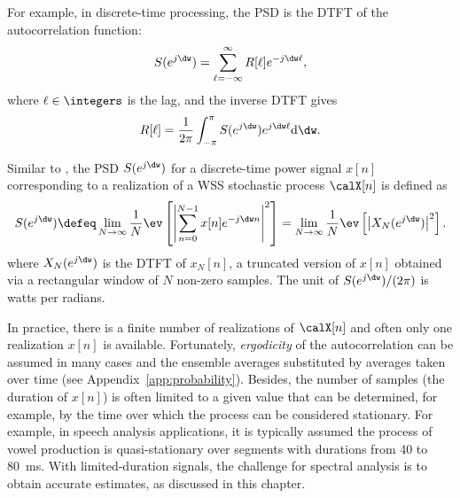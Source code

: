 For example, in discrete-time processing, the PSD is the DTFT of the autocorrelation function:
\begin{equation}
S(e^{j \dw}) = \sum_{\ell=-\infty}^\infty R[\ell] e^{-j \dw \ell},
\label{eq:discrete_psd}
\end{equation}
where $\ell \in \integers$ is the lag, and the inverse DTFT gives
\begin{equation}
R[\ell] =  \frac{1}{2 \pi} \int_{-\pi}^{\pi}  S(e^{j \dw}) e^{j \dw \ell} \textrm{d}\dw.
\label{eq:inverse_discrete_psd}
\end{equation}


Similar to , the PSD $S(e^{j \dw})$ for a discrete-time power signal $x[n]$ corresponding to a realization of a WSS stochastic process $\calX[n]$ is defined as
\begin{equation}
S(e^{j \dw}) \defeq \lim_{N \rightarrow \infty} \frac 1 N \ev \left[ \left| \sum_{n=0}^{N-1} x[n] e^{-j \dw n} \right|^2  \right] = \lim_{N \rightarrow \infty} \frac 1 N \ev \left[ \left| X_N(e^{j \dw}) \right|^2  \right].
\label{eq:psd_discretetime}
\end{equation}
where $X_N(e^{j \dw})$ is the DTFT of $x_N[n]$, a truncated version of $x[n]$ obtained via a rectangular window of $N$ non-zero samples.
The unit of $S(e^{j \dw})/(2 \pi)$ is watts per radians.

In practice, there is a finite number of realizations of $\calX[n]$ and often only one realization $x[n]$ is available. Fortunately, \emph{ergodicity} of the autocorrelation can be assumed in many cases and the ensemble averages substituted by averages taken over time (see Appendix~\ref{app:probability}). Besides, the number of samples (the duration of $x[n]$) is often limited to a given value that can be determined, for example, by the time over which the process can be considered stationary. For example, in speech analysis applications, it is typically assumed the process of vowel production is quasi-stationary over segments with durations from 40 to 80~ms. With limited-duration signals, the challenge for spectral analysis is to obtain accurate estimates, as discussed in this chapter.

